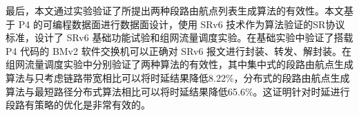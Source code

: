 最后，本文通过实验验证了所提出两种段路由航点列表生成算法的有效性。本文基于 \gls*{P4} \cite{P4LANG} 的可编程数据面进行数据面设计，使用 \gls*{SRv6} \cite{SRARK} 技术作为算法验证的SR协议标准，设计了 \gls*{SRv6} 基础功能试验和组网流量调度实验。在基础实验中验证了搭载 \gls*{P4} 代码的 \gls*{BMv2} 软件交换机可以正确对 \gls*{SRv6} 报文进行封装、转发、解封装。在组网流量调度实验中分别验证了两种算法的有效性，其中集中式的段路由航点生成算法与只考虑链路带宽相比可以将时延结果降低8.22\%，分布式的段路由航点生成算法与最短路径分布式算法相比可以将时延结果降低65.6\%。这证明针对时延进行段路有策略的优化是非常有效的。





